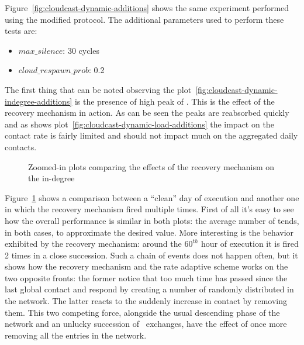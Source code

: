Figure~\ref{fig:cloudcast-dynamic-additions} shows the same experiment
performed using the modified \cloudcast protocol. The additional
parameters used to perform these tests are:
\begin{itemize}
  \item $max\_silence$: 30 cycles
  \item $cloud\_respawn\_prob$: 0.2
\end{itemize}

The first thing that can be noted observing the
plot~\ref{fig:cloudcast-dynamic-indegree-additions} is the presence of
high peak of \cloud \descriptors. This is the effect of the recovery
mechanism in action. As can be seen the peaks are reabsorbed quickly
and as shows plot~\ref{fig:cloudcast-dynamic-load-additions} the
impact on the \cloud contact rate is fairly limited and should not
impact much on the aggregated daily contacts.

\begin{figure}[h!]
  \centering
  \caption{Zoomed-in plots comparing the effects of the recovery
    mechanism on the \cloud in-degree}
  \label{fig:cloudcast-dynamic-indegree-additions-detail}
\end{figure}


Figure~\ref{fig:cloudcast-dynamic-indegree-additions-detail} shows a
comparison between a ``clean'' day of execution and another one in which the
recovery mechanism fired multiple times. First of all it's easy to see
how the overall performance is similar in both plots: the average
number of \cloud \descriptors tends, in both cases, to approximate the
desired value.
More interesting is the behavior exhibited by the recovery mechanism:
around the $60^{th}$ hour of execution it is fired 2 times in a close
succession. Such a chain of events does not happen often, but it shows
how the recovery mechanism and the \cloud rate adaptive scheme works
on the two opposite fronts: the former notice that too much time has
passed since the last global \cloud contact and respond by creating a
number of \cloud \descriptors randomly distributed in the network. The
latter reacts to the suddenly increase in contact by removing
them.
This two competing force, alongside the usual descending phase of the
network and an unlucky succession of \view\ exchanges, have the effect
of once more removing all the \cloud entries in the network.

